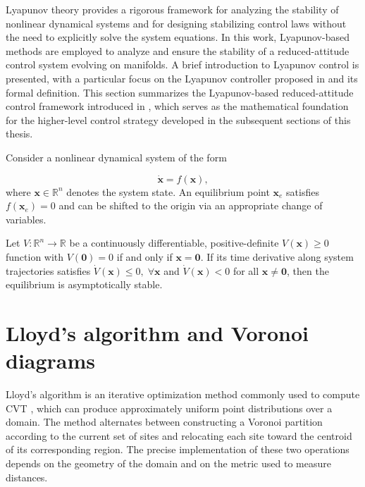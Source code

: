 Lyapunov theory provides a rigorous framework for analyzing the stability of nonlinear dynamical systems and for designing stabilizing control laws without the need to explicitly solve the system equations. In this work, Lyapunov-based methods are employed to analyze and ensure the stability of a reduced-attitude control system evolving on manifolds. A brief introduction to Lyapunov control is presented, with a particular focus on the Lyapunov controller proposed in \cite{rampAttitudeAngularVelocity2015,} and its formal definition. This section summarizes the Lyapunov-based reduced-attitude control framework introduced in \cite{rampAttitudeAngularVelocity2015,}, which serves as the mathematical foundation for the higher-level control strategy developed in the subsequent sections of this thesis.

Consider a nonlinear dynamical system of the form

\begin{equation}
    \dot{\mathbf{x}} = f(\mathbf{x}),
\end{equation}
where $\mathbf{x} \in \mathbb{R}^n$ denotes the system state. An equilibrium point $\mathbf{x}_e$ satisfies $f(\mathbf{x}_e) = 0$ and can be shifted to the origin via an appropriate change of variables.

Let $V : \mathbb{R}^n \rightarrow \mathbb{R}$ be a continuously differentiable, positive-definite $V(\mathbf{x}) \geq 0$ function with $V(\mathbf{0}) = 0$ if and only if $\mathbf{x} = \mathbf{0}$. If its time derivative along system trajectories satisfies $\dot{V}(\mathbf{x}) \le 0, \;  \forall \mathbf{x}$ and $\dot{V}(\mathbf{x}) < 0$ for all $\mathbf{x} \neq \mathbf{0}$, then the equilibrium is asymptotically stable.

\section{Lloyd's algorithm and Voronoi diagrams} \label{annex:Lloyd's algorithm}

Lloyd's algorithm is an iterative optimization method commonly used to compute \gls{CVT} \cite{duCentroidalVoronoiTessellations1999}, which can produce approximately uniform point distributions over a domain. The method alternates between constructing a Voronoi partition according to the current set of sites and relocating each site toward the centroid of its corresponding region. The precise implementation of these two operations depends on the geometry of the domain and on the metric used to measure distances.

